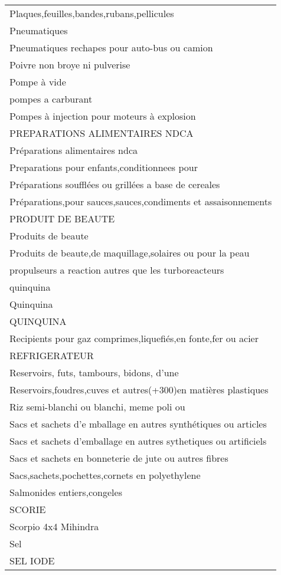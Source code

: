 \documentclass[
]{book}
\begin{document}
\begin{longtable}[t]{l}
Plaques,feuilles,bandes,rubans,pellicules\\
Pneumatiques\\
Pneumatiques rechapes pour auto-bus ou camion\\
\addlinespace
Poivre non broye ni pulverise\\
Pompe à vide\\
pompes a carburant\\
Pompes à injection pour moteurs à explosion\\
PREPARATIONS ALIMENTAIRES NDCA\\
\addlinespace
Préparations alimentaires ndca\\
Preparations pour enfants,conditionnees pour\\
Préparations soufflées ou grillées a base de cereales\\
Préparations,pour sauces,sauces,condiments et assaisonnements\\
PRODUIT DE BEAUTE\\
\addlinespace
Produits de beaute\\
Produits de beaute,de maquillage,solaires ou pour la peau\\
propulseurs a reaction autres que les turboreacteurs\\
quinquina\\
Quinquina\\
\addlinespace
QUINQUINA\\
Recipients pour gaz comprimes,liquefiés,en fonte,fer ou acier\\
REFRIGERATEUR\\
Reservoirs, futs, tambours, bidons, d'une\\
Reservoirs,foudres,cuves et autres(+300)en matières plastiques\\
\addlinespace
Riz semi-blanchi ou blanchi, meme poli ou\\
Sacs et sachets d'e mballage en autres synthétiques ou articles\\
Sacs et sachets d'emballage en autres sythetiques ou artificiels\\
Sacs et sachets en bonneterie de jute ou autres fibres\\
Sacs,sachets,pochettes,cornets en polyethylene\\
\addlinespace
Salmonides entiers,congeles\\
SCORIE\\
Scorpio 4x4 Mihindra\\
Sel\\
SEL IODE\\

\end{longtable}
\end{document}
